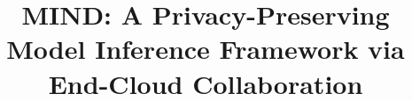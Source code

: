 \documentclass[conference]{IEEEtran}
\begin{document}
\title{MIND: A Privacy-Preserving Model Inference Framework via End-Cloud Collaboration
}

\end{document}
